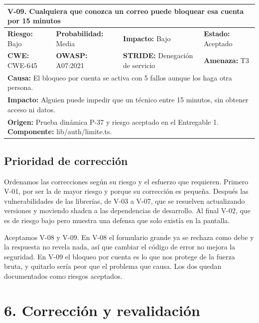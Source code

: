 \documentclass[12pt, letterpaper]{article}
\begin{document}
\vspace{8pt}

\noindent\begin{tabular}{|p{\celda}|p{\celda}|p{\celda}|p{\celda}|}
\hline
\multicolumn{4}{|p{\fila}|}{\cellcolor{gray!12}\textbf{V-09. Cualquiera que conozca un correo puede bloquear esa cuenta por 15 minutos}} \\
\hline
\cellcolor{yellow!25}\textbf{Riesgo:} Bajo & \textbf{Probabilidad:} Media & \textbf{Impacto:} Bajo & \textbf{Estado:} Aceptado \\
\hline
\textbf{CWE:} CWE-645 & \textbf{OWASP:} A07:2021 & \textbf{STRIDE:} Denegación de servicio & \textbf{Amenaza:} T3 \\
\hline
\multicolumn{4}{|p{\fila}|}{\textbf{Causa:} El bloqueo por cuenta se activa con 5 fallos aunque los haga otra persona.} \\
\hline
\multicolumn{4}{|p{\fila}|}{\textbf{Impacto:} Alguien puede impedir que un técnico entre 15 minutos, sin obtener acceso ni datos.} \\
\hline
\multicolumn{4}{|p{\fila}|}{\textbf{Origen:} Prueba dinámica P-37 y riesgo aceptado en el Entregable 1. \textbf{Componente:} lib/auth/limite.ts.} \\
\hline
\end{tabular}

\vspace{8pt}
\endgroup

\subsection{Prioridad de corrección}

Ordenamos las correcciones según su riesgo y el esfuerzo que requieren. Primero V-01, por ser la de mayor riesgo y porque su corrección es pequeña. Después las vulnerabilidades de las librerías, de V-03 a V-07, que se resuelven actualizando versiones y moviendo shadcn a las dependencias de desarrollo. Al final V-02, que es de riesgo bajo pero muestra una defensa que solo existía en la pantalla.

Aceptamos V-08 y V-09. En V-08 el formulario grande ya se rechaza como debe y la respuesta no revela nada, así que cambiar el código de error no mejora la seguridad. En V-09 el bloqueo por cuenta es lo que nos protege de la fuerza bruta, y quitarlo sería peor que el problema que causa. Los dos quedan documentados como riesgos aceptados.

\section{6. Corrección y revalidación}
\end{document}
